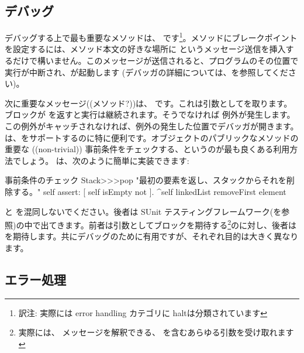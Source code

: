\documentclass[a4paper,10pt,twoside]{book}
\begin{document}

\subsection{デバッグ}

デバッグする上で最も重要なメソッドは、 です\footnote{訳注: 実際には error handling カテゴリに haltは分類されています}。メソッドにブレークポイントを設定するには、メソッド本文の好きな場所に  というメッセージ送信を挿入するだけで構いません。このメッセージが送信されると、プログラムのその位置で実行が中断され、が起動します
(デバッガの詳細については、を参照してください)。


次に重要なメッセージ((メソッド?))は、 です。これは引数としてを取ります。ブロックが  を返すと実行は継続されます。そうでなければ  例外が発生します。この例外がキャッチされなければ、例外の発生した位置でデバッガが開きます。 は、をサポートするのに特に便利です。オブジェクトのパブリックなメソッドの重要な ((non-trivial)) 事前条件をチェックする、というのが最も良くある利用方法でしょう。 は、次のように簡単に実装できます:

\begin{method}{事前条件のチェック}
Stack>>>pop
    "最初の要素を返し、スタックからそれを削除する。"
    self assert: [ self isEmpty not ].
    ^self linkedList removeFirst element
\end{method}

 と  を混同しないでください。後者は SUnit テスティングフレームワーク(を参照)の中で出てきます。前者は引数としてブロックを期待する\footnote{実際には、 メッセージを解釈できる、 を含むあらゆる引数を受け取れます}のに対し、後者は  を期待します。共にデバッグのために有用ですが、それぞれ目的は大きく異なります。

\subsection{エラー処理}
\end{document}
